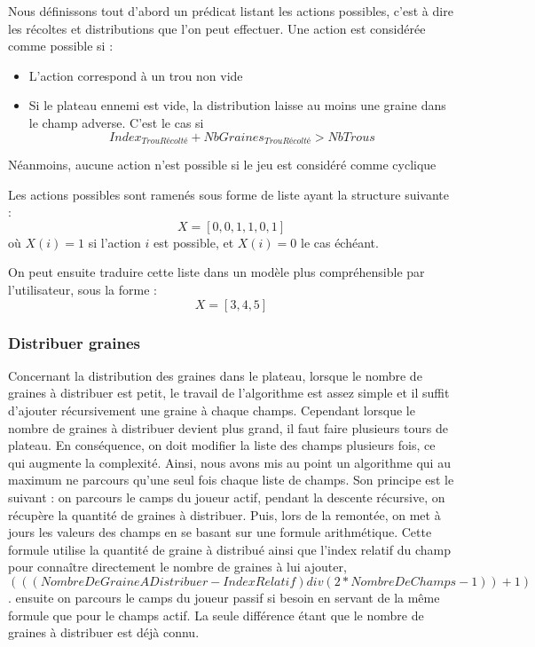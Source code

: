 \documentclass[]{article}
\begin{document}
Nous définissons tout d'abord un prédicat listant les actions possibles, c'est à dire les récoltes et distributions que l'on peut effectuer. Une action est considérée comme possible si : 
\begin{itemize}
\item L'action correspond à un trou non vide
\item Si le plateau ennemi est vide, la distribution laisse au moins une graine dans le champ adverse. C'est le cas si 
$$Index_{TrouRécolté} + NbGraines_{TrouRécolté} > NbTrous$$
\end{itemize}

Néanmoins, aucune action n'est possible si le jeu est considéré comme cyclique

Les actions possibles sont ramenés sous forme de liste ayant la structure suivante : 
$$X = [0,0,1,1,0,1]$$ où $X(i) = 1$ si l'action $i$ est possible, et $X(i) = 0$ le cas échéant.

On peut ensuite traduire cette liste dans un modèle plus compréhensible par l'utilisateur, sous la forme :
$$X = [3,4,5]$$

\subsubsection{Distribuer graines}

	Concernant la distribution des graines dans le plateau, lorsque le nombre de graines à distribuer est petit, le travail de l'algorithme est assez simple et il suffit d'ajouter récursivement une graine à chaque champs.
Cependant lorsque le nombre de graines à distribuer devient plus grand, il faut faire plusieurs tours de plateau. En conséquence, on doit modifier la liste des champs plusieurs fois, ce qui augmente la complexité.
Ainsi, nous avons mis au point un algorithme qui au maximum ne parcours qu'une seul fois chaque liste de champs.
Son principe est le suivant :
	on parcours le camps du joueur actif, pendant la descente récursive, on récupère la quantité de graines à distribuer. Puis, lors de la remontée, on met à jours les valeurs des champs en se basant sur une formule arithmétique. Cette formule utilise la quantité de graine à distribué ainsi que l'index relatif du champ pour connaître directement le nombre de graines à lui ajouter, $$(((NombreDeGraineADistribuer-IndexRelatif) div (2*NombreDeChamps-1)) + 1)$$.
	ensuite on parcours le camps du joueur passif si besoin en servant de la même formule que pour le champs actif. La seule différence étant que le nombre de graines à distribuer est déjà connu.
\end{document}
